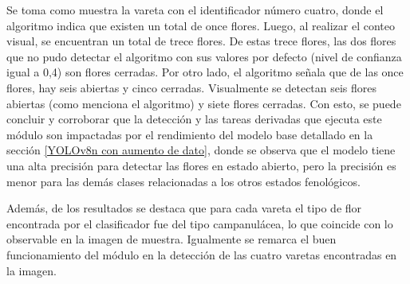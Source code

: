 Se toma como muestra la vareta con el identificador número cuatro, donde el algoritmo indica que existen un total de once flores. Luego, al realizar el conteo visual, se encuentran un total de trece flores. De estas trece flores, las dos flores que no pudo detectar el algoritmo con sus valores por defecto (nivel de confianza igual a 0,4) son flores cerradas. Por otro lado, el algoritmo señala que de las once flores, hay seis abiertas y cinco cerradas. Visualmente se detectan seis flores abiertas (como menciona el algoritmo) y siete flores cerradas. Con esto, se puede concluir y corroborar que la detección y las tareas derivadas que ejecuta este módulo son impactadas por el rendimiento del modelo base detallado en la sección \ref{YOLOv8n con aumento de dato}, donde se observa que el modelo tiene una alta precisión para detectar las flores en estado abierto, pero la precisión es menor para las demás clases relacionadas a los otros estados fenológicos.

Además, de los resultados se destaca que para cada vareta el tipo de flor encontrada por el clasificador fue del tipo campanulácea, lo que coincide con lo observable en la imagen de muestra. Igualmente se remarca el buen funcionamiento del módulo en la detección de las cuatro varetas encontradas en la imagen.